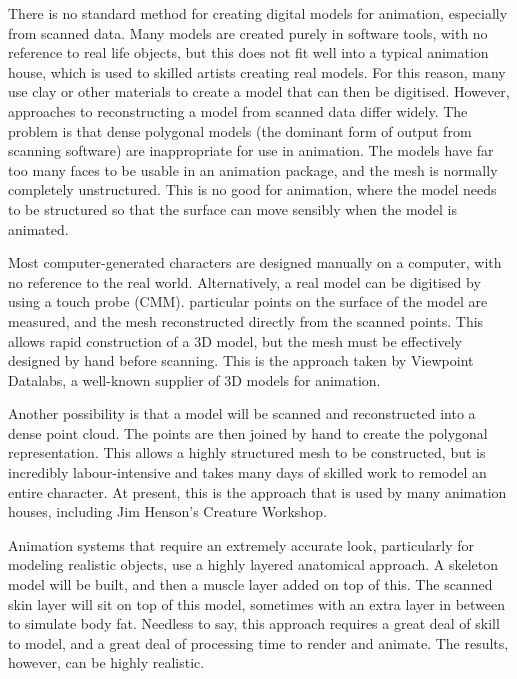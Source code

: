 \documentclass[10pt,oneside,fleqn,a4paper]{book}
\begin{document}
There is no standard method for creating digital models for animation, especially from scanned data. Many models are created purely in software tools, with no reference to real life objects, but this does not fit well into a typical animation house, which is used to skilled artists creating real models. For this reason, many use clay or other materials to create a model that can then be digitised. However, approaches to reconstructing a model from scanned data differ widely. The problem is that dense polygonal models (the dominant form of output from scanning software) are inappropriate for use in animation. The models have far too many faces to be usable in an animation package, and the mesh is normally completely unstructured. This is no good for animation, where the model needs to be structured so that the surface can move sensibly when the model is animated.

Most computer-generated characters are designed manually on a computer, with no reference to the real world. Alternatively, a real model can be digitised by using a touch probe (CMM). particular points on the surface of the model are measured, and the mesh reconstructed directly from the scanned points. This allows rapid construction of a 3D model, but the mesh must be effectively designed by hand before scanning. This is the approach taken by Viewpoint Datalabs, a well-known supplier of 3D models for animation.

Another possibility is that a model will be scanned and reconstructed into a dense point cloud. The points are then joined by hand to create the polygonal representation. This allows a highly structured mesh to be constructed, but is incredibly labour-intensive and takes many days of skilled work to remodel an entire character. At present, this is the approach that is used by many animation houses, including Jim Henson's Creature Workshop.

Animation systems that require an extremely accurate look, particularly for modeling realistic objects, use a highly layered anatomical approach. A skeleton model will be built, and then a muscle layer added on top of this. The scanned skin layer will sit on top of this model, sometimes with an extra layer in between to simulate body fat. Needless to say, this approach requires a great deal of skill to model, and a great deal of processing time to render and animate. The results, however, can be highly realistic.
\end{document}
